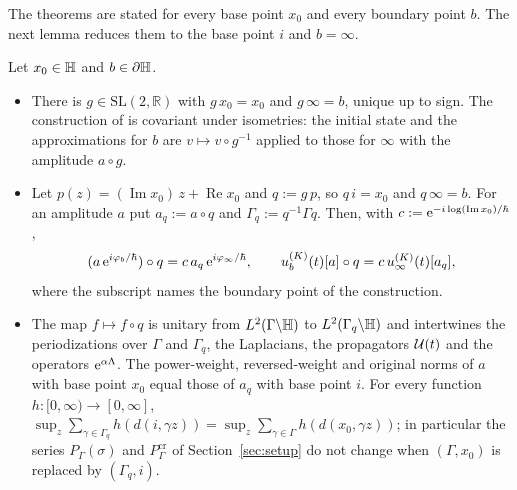 The theorems are stated for every base point $x_0$ and every boundary point $b$. The next lemma reduces them to the base
point $i$ and $b=\infty$.

\begin{lemma}\label{lem:base}
Let $x_0\in\mathbb{H}$ and $b\in\partial\mathbb{H}$.
\begin{itemize}
\item[\textup{(i)}] There is $g\in\mathrm{SL}(2,\mathbb R)$ with $g\,x_0=x_0$ and $g\,\infty=b$, unique up to sign. The construction of \cite[(1.20)--(1.29)]{S} is covariant under isometries: the initial state and
the approximations for $b$ are $v\mapsto v\circ g^{-1}$ applied to those for $\infty$ with the amplitude $a\circ g$.
\item[\textup{(ii)}] Let $p(z)=(\operatorname{Im}x_0)\,z+\operatorname{Re}x_0$ and $q:=g\,p$, so $q\,i=x_0$ and $q\,\infty=b$. For an amplitude $a$ put
$a_q:=a\circ q$ and $\Gamma_q:=q^{-1}\Gamma q$. Then, with $c:=\mathrm{e}^{-i\log(\operatorname{Im}x_0)/\hbar}$,
\[
(a\,\mathrm{e}^{i\varphi_b/\hbar})\circ q=c\,a_q\,\mathrm{e}^{i\varphi_\infty/\hbar},\qquad u^{(K)}_b(t)[a]\circ q=c\,u^{(K)}_\infty(t)[a_q],
\]
where the subscript names the boundary point of the construction.
\item[\textup{(iii)}] The map $f\mapsto f\circ q$ is unitary from $L^2(\Gamma\backslash\mathbb{H})$ to $L^2(\Gamma_q\backslash\mathbb{H})$ and intertwines the
periodizations over $\Gamma$ and $\Gamma_q$, the Laplacians, the propagators $\mathcal{U}(t)$ and the operators $\mathrm{e}^{\alpha\Lambda}$. The power-weight, reversed-weight and original norms of $a$ with base point $x_0$ equal those of $a_q$
with base point $i$. For every function $h:[0,\infty)\to[0,\infty]$,
$\sup_z\sum_{\gamma\in\Gamma_q}h(d(i,\gamma z))=\sup_z\sum_{\gamma\in\Gamma}h(d(x_0,\gamma z))$; in particular the series $P_\Gamma(\sigma)$
and $P^{\mathrm{cr}}_\Gamma$ of Section~\ref{sec:setup} do not change when $(\Gamma,x_0)$ is replaced by $(\Gamma_q,i)$.
\end{itemize}
\end{lemma}


